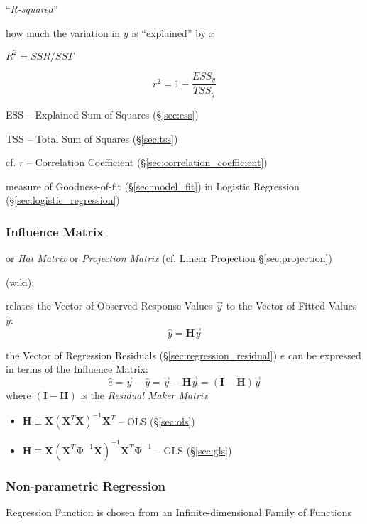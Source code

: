 ``\emph{R-squared}''

how much the variation in $y$ is ``explained'' by $x$

$R^2 = SSR/SST$

\[
  r^2 = 1 - \frac{
    ESS_{\hat{y}}
  }{
    TSS_{\overline{y}}
  }
\]

ESS -- Explained Sum of Squares (\S\ref{sec:ess})

TSS -- Total Sum of Squares (\S\ref{sec:tss})

cf. $r$ -- Correlation Coefficient (\S\ref{sec:correlation_coefficient})

measure of Goodness-of-fit (\S\ref{sec:model_fit}) in Logistic Regression
(\S\ref{sec:logistic_regression})



\subsubsection{Influence Matrix}\label{sec:influence_matrix}

or \emph{Hat Matrix} or \emph{Projection Matrix} (cf.
Linear Projection \S\ref{sec:projection})

(wiki):

relates the Vector of Observed Response Values $\vec{y}$ to the Vector of Fitted
Values $\hat{y}$:
\[
  \hat{y} = \mathbf{H}\vec{y}
\]

the Vector of Regression Residuals (\S\ref{sec:regression_residual}) $\hat{e}$
can be expressed in terms of the Influence Matrix:
\[
  \hat{e} = \vec{y} - \hat{y} = \vec{y} - \mathbf{H}\vec{y} =
    (\mathbf{I} - \mathbf{H})\vec{y}
\]
where $(\mathbf{I} - \mathbf{H})$ is the \emph{Residual Maker Matrix}

\begin{itemize}
  \item $\mathbf{H} \equiv \mathbf{X}(\mathbf{X}^T\mathbf{X})^{-1}\mathbf{X}^T$
    -- OLS (\S\ref{sec:ols})
  \item $\mathbf{H} \equiv \mathbf{X}
    (\mathbf{X}^T\mathbf{\Psi}^{-1}\mathbf{X})^{-1}
    \mathbf{X}^T\mathbf{\Psi}^{-1}$
    -- GLS (\S\ref{sec:gls})
\end{itemize}



\subsubsection{Non-parametric Regression}\label{sec:nonparametric_regression}

Regression Function is chosen from an Infinite-dimensional Family of Functions

